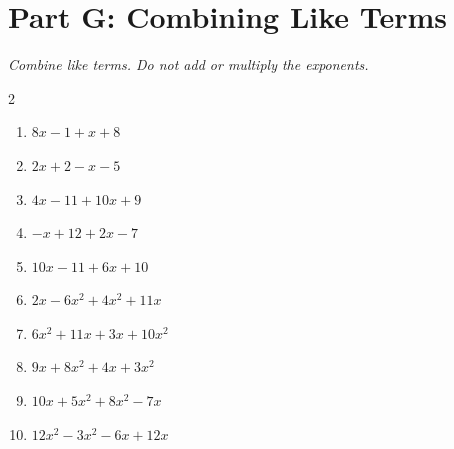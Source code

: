 \documentclass[11pt]{article}
\begin{document}
\section*{Part G: Combining Like Terms}
\noindent\textit{Combine like terms. Do not add or multiply the exponents.}
\begin{multicols}{2}
\begin{enumerate}
  \item $8x - 1 + x + 8$
  \vspace{1.3cm}
  \item $2x + 2 - x - 5$
  \vspace{1.3cm}
  \item $4x - 11 + 10x + 9$
  \vspace{1.3cm}
  \item $-x + 12 + 2x - 7$
  \vspace{1.3cm}
  \item $10x - 11 + 6x + 10$
  \vspace{1.3cm}
  \item $2x - 6x^{2} + 4x^{2} + 11x$
  \vspace{1.3cm}
  \item $6x^{2} + 11x + 3x + 10x^{2}$
  \vspace{1.3cm}
  \item $9x + 8x^{2} + 4x + 3x^{2}$
  \vspace{1.3cm}
  \item $10x + 5x^{2} + 8x^{2} - 7x$
  \vspace{1.3cm}
  \item $12x^{2} - 3x^{2} - 6x + 12x$
  \vspace{1.3cm}
\end{enumerate}
\end{multicols}
\end{document}
